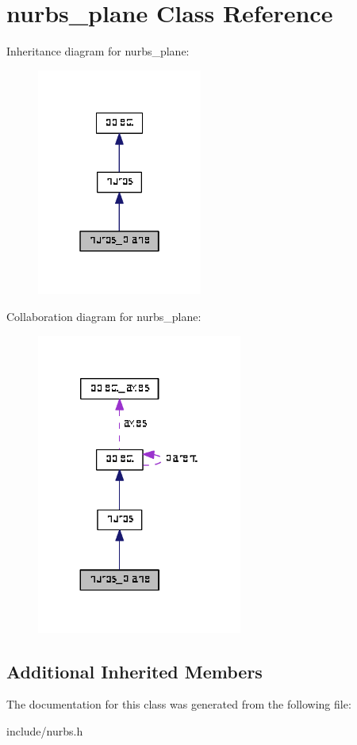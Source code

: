 \hypertarget{classnurbs__plane}{}\section{nurbs\+\_\+plane Class Reference}
\label{classnurbs__plane}


Inheritance diagram for nurbs\+\_\+plane\+:\nopagebreak
\begin{figure}[H]
\begin{center}
\leavevmode
\includegraphics[width=154pt]{classnurbs__plane__inherit__graph}
\end{center}
\end{figure}


Collaboration diagram for nurbs\+\_\+plane\+:\nopagebreak
\begin{figure}[H]
\begin{center}
\leavevmode
\includegraphics[width=191pt]{classnurbs__plane__coll__graph}
\end{center}
\end{figure}
\subsection*{Additional Inherited Members}


The documentation for this class was generated from the following file\+:\begin{DoxyCompactItemize}
\item 
include/nurbs.\+h\end{DoxyCompactItemize}
